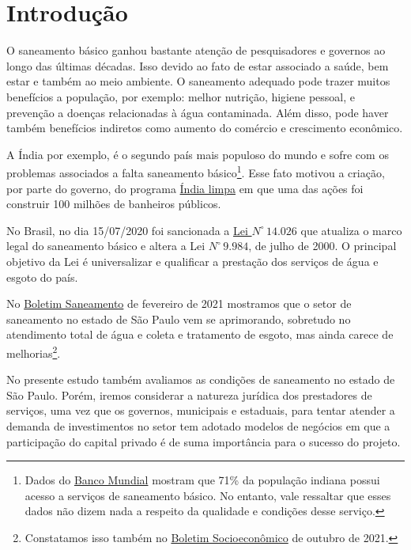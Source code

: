 
\section{Introdução}

\begin{multicols}{2}

O saneamento básico ganhou bastante atenção de pesquisadores e governos ao longo das últimas décadas. Isso devido ao fato de estar associado a saúde, bem estar e também ao meio ambiente. O saneamento adequado pode trazer muitos benefícios a população, por exemplo: melhor nutrição, higiene pessoal, e prevenção a doenças relacionadas à água contaminada. Além disso, pode haver também benefícios indiretos como aumento do comércio e crescimento econômico.

A Índia por exemplo, é o segundo país mais populoso do mundo e sofre com os problemas associados a falta saneamento básico\footnote{
Dados do \href{https://data.worldbank.org/indicator/SH.STA.BASS.ZS?locations=IN}{Banco Mundial} mostram que 71\% da população indiana possui acesso a serviços de saneamento básico. No entanto, vale ressaltar que esses dados não dizem nada a respeito da qualidade e condições desse serviço.
}. Esse fato motivou a criação, por parte do governo, do programa \href{https://siwi.org/latest/the-clean-india-mission-worlds-largest-sanitation-initiative/}{Índia limpa} em que uma das ações foi construir 100 milhões de banheiros públicos.


No Brasil, no dia 15/07/2020 foi sancionada a \href{http://www.planalto.gov.br/ccivil_03/_ato2019-2022/2020/lei/l14026.htm}{Lei $N^\circ \, 14.026$} que atualiza o marco legal do saneamento básico e altera a Lei $N^\circ \, 9.984$, de julho de 2000. O principal objetivo da Lei é universalizar e qualificar a prestação dos serviços de água e esgoto do país. 

No \href{https://www.fundace.org.br/assets/uploads/_up_ceper_estudos/ceper_20210_00035.pdf}{Boletim Saneamento} de fevereiro de 2021 mostramos que o setor de saneamento no estado de São Paulo vem se aprimorando, sobretudo no
atendimento total de água e coleta e tratamento de esgoto, mas ainda carece de melhorias\footnote{Constatamos isso também no \href{https://www.fundace.org.br/assets/uploads/_up_ceper_estudos/ceper_20210_00039.pdf}{Boletim Socioeconômico} de outubro de 2021.}. 

No presente estudo também avaliamos as condições de saneamento no estado de São Paulo. Porém, iremos considerar a natureza jurídica dos prestadores de serviços, uma vez que os governos, municipais e estaduais, para tentar atender a demanda de investimentos no setor tem adotado modelos de negócios em que a participação do capital privado é de suma importância para o sucesso do projeto.


\end{multicols}
